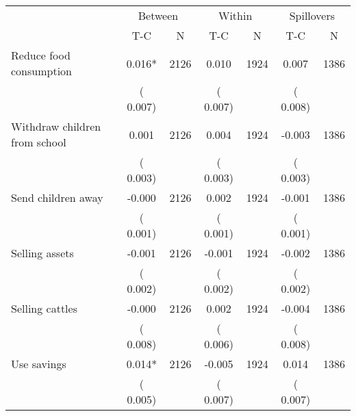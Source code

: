 
\begin{tabular}{l*{6}{c}}\hline&\multicolumn{2}{c}{Between}&\multicolumn{2}{c}{Within}&\multicolumn{2}{c}{Spillovers} \\ \cmidrule(r){2-3}\cmidrule(l){4-5}\cmidrule(l){6-7} & {T-C} & {N} & {T-C} & {N}  & {T-C}  & {N}  \\ \midrule
Reduce food consumption        &              0.016*      &       2126       &              0.010      &       1924       &              0.007      &       1386       \\
                       &       (       0.007)            &                               &       (       0.007)            &                               &       (       0.008)            &                               \\
Withdraw children from school        &              0.001      &       2126       &              0.004      &       1924       &             -0.003      &       1386       \\
                       &       (       0.003)            &                               &       (       0.003)            &                               &       (       0.003)            &                               \\
Send children away        &             -0.000      &       2126       &              0.002      &       1924       &             -0.001      &       1386       \\
                       &       (       0.001)            &                               &       (       0.001)            &                               &       (       0.001)            &                               \\
Selling assets        &             -0.001      &       2126       &             -0.001      &       1924       &             -0.002      &       1386       \\
                       &       (       0.002)            &                               &       (       0.002)            &                               &       (       0.002)            &                               \\
Selling cattles        &             -0.000      &       2126       &              0.002      &       1924       &             -0.004      &       1386       \\
                       &       (       0.008)            &                               &       (       0.006)            &                               &       (       0.008)            &                               \\
Use savings        &              0.014*      &       2126       &             -0.005      &       1924       &              0.014      &       1386       \\
                       &       (       0.005)            &                               &       (       0.007)            &                               &       (       0.007)            &                               \\
\hline \end{tabular}